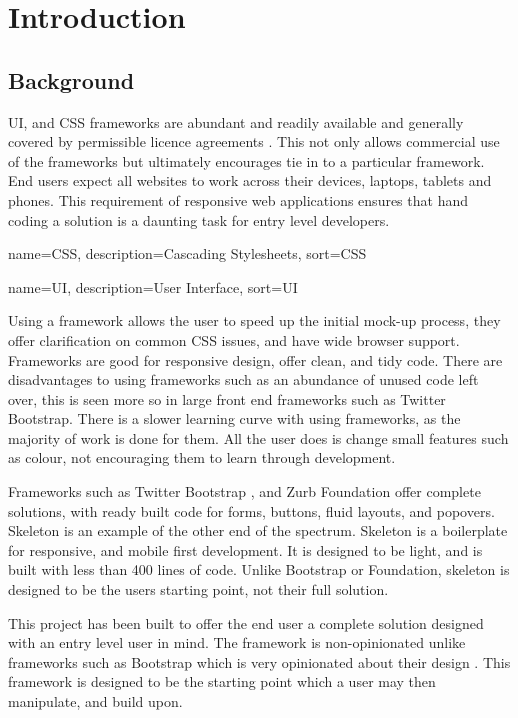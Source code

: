 \newpage
\chapter*{Introduction}
\section*{Background}

\gls{UI}, and \gls{CSS} frameworks are abundant and readily available and generally covered by permissible licence agreements \citep{CODY16}. This not only allows commercial use of the frameworks but ultimately encourages tie in to a particular framework. End users expect all websites to work across their devices, laptops, tablets and phones. This requirement of responsive web applications ensures that hand coding a solution is a daunting task for entry level developers.




%
{
  name={CSS},
  description={Cascading Stylesheets},
  sort=CSS
}
%


%
{
  name={UI},
  description={User Interface},
  sort=UI
}
%

Using a framework allows the user to speed up the initial mock-up process, they offer clarification on common \gls{CSS} issues, and have wide browser support. Frameworks are good for responsive design, offer clean, and tidy code. There are disadvantages to using frameworks such as an abundance of unused code left over, this is seen more so in large front end frameworks such as Twitter Bootstrap. There is a slower learning curve with using frameworks, as the majority of work is done for them. All the user does is change small features such as colour, not encouraging them to learn through development.

Frameworks such as Twitter Bootstrap \citep{SASS16}, and Zurb Foundation \citep{LESS16} offer complete solutions, with ready built code for forms, buttons, fluid layouts, and popovers. Skeleton \citep{SKEL16} is an example of the other end of the spectrum. Skeleton is a boilerplate for responsive, and mobile first development. It is designed to be light, and is built with less than 400 lines of code. Unlike Bootstrap or Foundation, skeleton is designed to be the users starting point, not their full solution. 

This project has been built to offer the end user a complete solution designed with an entry level user in mind. The framework is non-opinionated unlike frameworks such as Bootstrap which is very opinionated about their design \citet{KEMH16}. This framework is 
designed to be the starting point which a user may then manipulate, and build upon.

